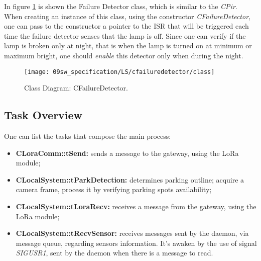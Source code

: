 
In figure \ref{fig:classfail} is shown the Failure Detector class, which is similar to the \textit{CPir}. When creating an instance of this class, using the constructor \textit{CFailureDetector}, one can pass to the constructor a pointer to the ISR that will be triggered each time the failure detector senses that the lamp is off. Since one can verify if the lamp is broken only at night, that is when the lamp is turned on at minimum or maximum bright, one should \textit{enable} this detector only when during the night.

\begin{figure}[H]
	\centering
	\texttt{[image: 09sw\_specification/LS/cfailuredetector/class]}
	\caption{Class Diagram: CFailureDetector.}
	\label{fig:classfail}
\end{figure}

\clearpage
\subsection{Task Overview}

One can list the tasks that compose the main process:
\begin{itemize}
 	\item \textbf{CLoraComm::tSend:} sends a message to the gateway, using the LoRa module;
	\item \textbf{CLocalSystem::tParkDetection:} determines parking outline; acquire a camera frame, process it by verifying parking spots availability;
	\item \textbf{CLocalSystem::tLoraRecv:} receives a message from the gateway, using the LoRa module;
	\item \textbf{CLocalSystem::tRecvSensor:} receives messages sent by the daemon, via message queue, regarding sensors information. It's awaken by the use of signal \textit{SIGUSR1}, sent by the daemon when there is a message to read.
\end{itemize}

